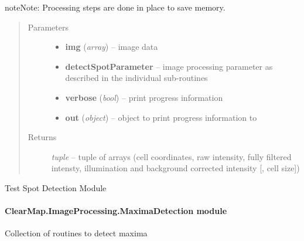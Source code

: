 \documentclass[letterpaper,10pt,english]{sphinxmanual}
\begin{document}
\begin{fulllineitems}
\begin{description}
\begin{itemize}
\end{itemize}

\end{description}

\begin{notice}{note}{Note:}
Processing steps are done in place to save memory.
\end{notice}
\begin{quote}\begin{description}
\item[{Parameters}] \leavevmode\begin{itemize}
\item {} 
\textbf{img} (\emph{array}) --
image data

\item {} 
\textbf{detectSpotParameter} --
image processing parameter as described in the individual sub-routines

\item {} 
\textbf{verbose} (\emph{bool}) --
print progress information

\item {} 
\textbf{out} (\emph{object}) --
object to print progress information to

\end{itemize}

\item[{Returns}] \leavevmode
\emph{tuple} --
tuple of arrays (cell coordinates, raw intensity, fully filtered intensty, illumination and background corrected intensity {[}, cell size{]})

\end{description}\end{quote}

\end{fulllineitems}


\begin{fulllineitems}
\label{api/ClearMap.ImageProcessing:ClearMap.ImageProcessing.SpotDetection.test}
Test Spot Detection Module

\end{fulllineitems}



\paragraph{ClearMap.ImageProcessing.MaximaDetection module}
\label{api/ClearMap.ImageProcessing:module-ClearMap.ImageProcessing.MaximaDetection}\label{api/ClearMap.ImageProcessing:clearmap-imageprocessing-maximadetection-module}
Collection of routines to detect maxima
\end{document}
